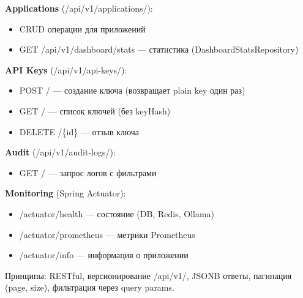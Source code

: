{\textbf{Applications} (/api/v1/applications/):
\begin{itemize}
  \item CRUD операции для приложений
  \item GET /api/v1/dashboard/stats — статистика (DashboardStatsRepository)
\end{itemize}

\textbf{API Keys} (/api/v1/api-keys/):
\begin{itemize}
  \item POST / — создание ключа (возвращает plain key один раз)
  \item GET / — список ключей (без keyHash)
  \item DELETE /\{id\} — отзыв ключа
\end{itemize}

\textbf{Audit} (/api/v1/audit-logs/):
\begin{itemize}
  \item GET / — запрос логов с фильтрами
\end{itemize}

\textbf{Monitoring} (Spring Actuator):
\begin{itemize}
  \item /actuator/health — состояние (DB, Redis, Ollama)
  \item /actuator/prometheus — метрики Prometheus
  \item /actuator/info — информация о приложении
\end{itemize}

Принципы: RESTful, версионирование /api/v1/, JSONB ответы, пагинация (page, size), фильтрация через query params.}
